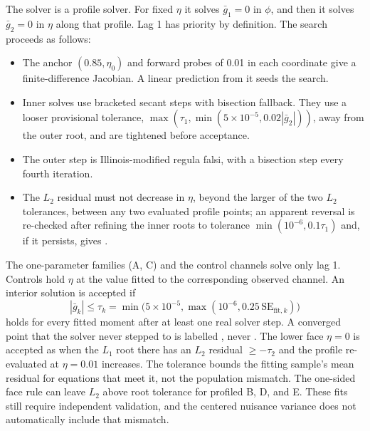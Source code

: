 The solver is a profile solver. For fixed $\eta$ it solves $\bar g_1=0$ in $\phi$, and then it solves $\bar g_2=0$ in $\eta$ along that profile. Lag 1 has priority by definition. The search proceeds as follows:
\begin{itemize}
\item The anchor $(0.85,\eta_0)$ and forward probes of 0.01 in each coordinate give a finite-difference Jacobian. A linear prediction from it seeds the search.
\item Inner solves use bracketed secant steps with bisection fallback. They use a looser provisional tolerance, $\max(\tau_1,\min(5\times10^{-5},0.02|\bar g_2|))$, away from the outer root, and are tightened before acceptance.
\item The outer step is Illinois-modified regula falsi, with a bisection step every fourth iteration.
\item The $L_2$ residual must not decrease in $\eta$, beyond the larger of the two $L_2$ tolerances, between any two evaluated profile points; an apparent reversal is re-checked after refining the inner roots to tolerance $\min(10^{-6},0.1\tau_1)$ and, if it persists, gives .
\end{itemize}
The one-parameter families (A, C) and the control channels solve only lag 1. Controls hold $\eta$ at the value fitted to the corresponding observed channel. An interior solution is accepted if
\begin{equation*}
|\bar g_k|\le\tau_k=\min\!\bigl(5\times10^{-5},\max(10^{-6},0.25\,\mathrm{SE}_{\mathrm{fit},k})\bigr)
\end{equation*}
holds for every fitted moment after at least one real solver step. A converged point that the solver never stepped to is labelled , never . The lower face $\eta=0$ is accepted as  when the $L_1$ root there has an $L_2$ residual $\ge-\tau_2$ and the profile re-evaluated at $\eta=0.01$ increases.
The tolerance bounds the fitting sample's mean residual for equations that meet it, not the population mismatch. The one-sided face rule can leave $L_2$ above root tolerance for profiled B, D, and E. These fits still require independent validation, and the centered nuisance variance does not automatically include that mismatch. %

